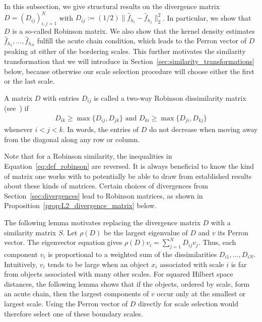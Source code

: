 In this subsection, we give structural results on the divergence matrix $D=(D_{ij})_{i,j=1}^{N}$ with $D_{ij}:=(1/2)\|\hat{f}_{h_i}-\hat{f}_{h_j}\|_2^2$. In particular, we show that $D$ is a so-called Robinson matrix. We also show that the kernel density estimates $\hat{f}_{h_1},\dots,\hat{f}_{h_N}$ fulfill the acute chain condition, which leads to the Perron vector of $D$ peaking at either of the bordering scales. This further motivates the similarity transformation that we will introduce in Section~\ref{sec:similarity_transformations} below, because otherwise our scale selection procedure will choose either the first or the last scale.


\begin{Def}
    A matrix $D$ with entries $D_{ij}$ is called a two-way Robinson dissimilarity matrix (see~\cite[Section~1.1]{BRUCKER2026306}) if
    \begin{align}\label{eq:def_robinson}
        D_{ik}\ge\max\{D_{ij},D_{jk}\}\text{ and }D_{ki}\ge\max\{D_{ji},D_{kj}\}
    \end{align}
    whenever $i<j<k$. In words, the entries of $D$ do not decrease when moving away from the diagonal along any row or column.
\end{Def}

Note that for a Robinson similarity, the inequalities in Equation~\eqref{eq:def_robinson} are reversed. It is always beneficial to know the kind of matrix one works with to potentially be able to draw from established results about these kinds of matrices. Certain choices of divergences from Section~\ref{sec:divergences} lead to Robinson matrices, as shown in Proposition~\ref{prop:L2_divergence_matrix} below.

The following lemma motivates replacing the divergence matrix $D$ with a similarity matrix $S$. Let $\rho(D)$ be the largest eigenvalue of $D$ and $v$ its Perron vector. The eigenvector equation gives $\rho(D)v_i=\sum_{j=1}^{N}D_{ij}v_j$. Thus, each component $v_i$ is proportional to a weighted sum of the dissimilarities $D_{i1},\dots,D_{iN}$. Intuitively, $v_i$ tends to be large when an object $x_i$ associated with scale $i$ is far from objects associated with many other scales. For squared Hilbert space distances, the following lemma shows that if the objects, ordered by scale, form an acute chain, then the largest components of $v$ occur only at the smallest or largest scale. Using the Perron vector of $D$ directly for scale selection would therefore select one of these boundary scales.


